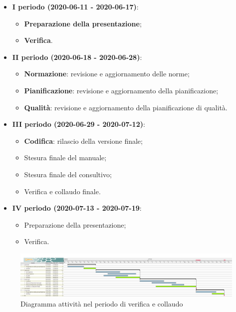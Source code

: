\documentclass[../piano-di-progetto.tex]{subfiles}
\begin{document}
\begin{itemize}
    \item \textbf{I periodo (2020-06-11 - 2020-06-17)}:
        \begin{itemize}
            \item \textbf{Preparazione della presentazione};
            \item \textbf{Verifica}.
        \end{itemize}
    \item \textbf{II periodo (2020-06-18 - 2020-06-28)}:
        \begin{itemize}
            \item \textbf{Normazione}: revisione e aggiornamento delle norme;
            \item \textbf{Pianificazione}: revisione e aggiornamento della pianificazione;
            \item \textbf{Qualità}: revisione e aggiornamento della pianificazione di qualità.
        \end{itemize}
    \item \textbf{III periodo (2020-06-29 - 2020-07-12)}:
        \begin{itemize}
            \item \textbf{Codifica}: rilascio della versione finale;
            \item Stesura finale del manuale;
            \item Stesura finale del consultivo;
            \item Verifica e collaudo finale.
        \end{itemize}
    \item \textbf{IV periodo (2020-07-13 - 2020-07-19}:
        \begin{itemize}
            \item Preparazione della presentazione;
            \item Verifica.
        \end{itemize}
\end{itemize}

\newpage
\begin{landscape}
    \begin{figure}[H]
        \centering
        \includegraphics[width=24cm]{img/verifica.png}
        \caption{Diagramma attività nel periodo di verifica e collaudo}
      \end{figure}
\end{landscape}
\end{document}
